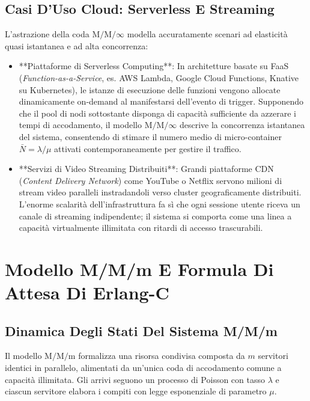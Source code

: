 \documentclass[11pt, a4paper]{article}
\begin{document}
\subsection{Casi D'Uso Cloud: Serverless E Streaming}

L'astrazione della coda $\mathrm{M/M/\infty}$ modella accuratamente scenari ad elasticità quasi istantanea e ad alta concorrenza:
\begin{itemize}
    \item **Piattaforme di Serverless Computing**: In architetture basate su FaaS (\emph{Function-as-a-Service}, es. AWS Lambda, Google Cloud Functions, Knative su Kubernetes), le istanze di esecuzione delle funzioni vengono allocate dinamicamente on-demand al manifestarsi dell'evento di trigger. Supponendo che il pool di nodi sottostante disponga di capacità sufficiente da azzerare i tempi di accodamento, il modello $\mathrm{M/M/\infty}$ descrive la concorrenza istantanea del sistema, consentendo di stimare il numero medio di micro-container $\bar{N} = \lambda/\mu$ attivati contemporaneamente per gestire il traffico.
    \item **Servizi di Video Streaming Distribuiti**: Grandi piattaforme CDN (\emph{Content Delivery Network}) come YouTube o Netflix servono milioni di stream video paralleli instradandoli verso cluster geograficamente distribuiti. L'enorme scalarità dell'infrastruttura fa sì che ogni sessione utente riceva un canale di streaming indipendente; il sistema si comporta come una linea a capacità virtualmente illimitata con ritardi di accesso trascurabili.
\end{itemize}

\newpage


\section{Modello M/M/m E Formula Di Attesa Di Erlang-C}

\subsection{Dinamica Degli Stati Del Sistema M/M/m}

Il modello $\mathrm{M/M/m}$ formalizza una risorsa condivisa composta da $m$ servitori identici in parallelo, alimentati da un'unica coda di accodamento comune a capacità illimitata. Gli arrivi seguono un processo di Poisson con tasso $\lambda$ e ciascun servitore elabora i compiti con legge esponenziale di parametro $\mu$.
\end{document}
